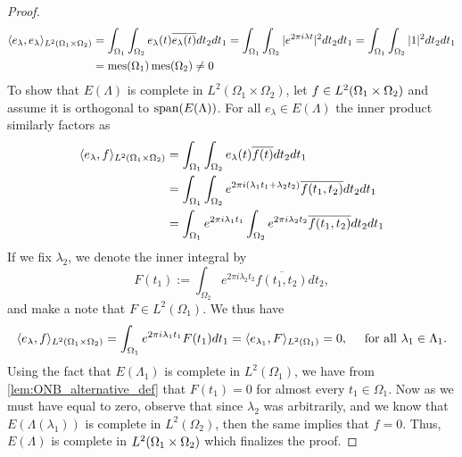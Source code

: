 \documentclass[../thesis.tex]{subfiles}
\begin{document}
\begin{proof}
    \begin{align*}
        \langle e_\lambda, e_\lambda\rangle_{L^2(\Omega_1 \times \Omega_2)}
        &= \int_{\Omega_1} \int_{\Omega_2} e_{\lambda}(t) \overline{e_{\lambda}(t)} dt_2 dt_1
        =\int_{\Omega_1} \int_{\Omega_2} |e^{2 \pi i \lambda t}|^2 dt_2 dt_1
        = \int_{\Omega_1} \int_{\Omega_2} |1|^2 dt_2 dt_1\\
        &= \operatorname{mes}(\Omega_1)\operatorname{mes}(\Omega_2) \neq 0
    \end{align*}
    To show that $E(\Lambda)$ is complete in $L^2(\Omega_1 \times \Omega_2)$, let $f\in L^2(\Omega_1 \times \Omega_2)$ and assume it is orthogonal to $\operatorname{span}(E(\Lambda))$. For all $e_\lambda \in E(\Lambda)$ the inner product similarly factors as
    \begin{align*} %
        \braa{e_\lambda,f}_{L^2\brac{\Omega_1 \times \Omega_2}}
        &= \int_{\Omega_1} \int_{\Omega_2} e_\lambda(t) \overline{f(t)} dt_2dt_1 \\
        &= \int_{\Omega_1} \int_{\Omega_2} e^{2\pi i  (\lambda_1 t_1 + \lambda_2 t_2)} \overline{f(t_1,t_2)} dt_2 dt_1 \\
        &= \int_{\Omega_1} e^{2 \pi i \lambda_1 t_1} \int_{\Omega_2}e^{2 \pi i \lambda_2 t_2} \overline{f(t_1,t_2)} dt_2 dt_1
    \end{align*}
    If we fix $\lambda_2$, we denote the inner integral by 
    \begin{equation}\label{eq:inner_eq}
        F(t_1) := \int_{\Omega_2} e^{2 \pi i \lambda_2 t_2} \overline{f(t_1,t_2)} dt_2,
    \end{equation}
    and make a note that $F\in L^2(\Omega_1)$. We thus have %
    \begin{equation}\label{eq:outter_eq}
        \langle e_{\lambda}, f\rangle_{L^2(\Omega_1\times \Omega_2)} = \int_{\Omega_1} e^{2 \pi i \lambda_1 t_1} F(t_1) dt_1 = \langle e_{\lambda_1}, F\rangle_{L^2(\Omega_1)} = 0, \quad \text{ for all } \lambda_1 \in \Lambda_1 .
    \end{equation}
    Using the fact that $E(\Lambda_1)$ is complete in $L^2(\Omega_1)$, we have from \cref{lem:ONB_alternative_def} that $F(t_1)=0$ for almost every $t_1 \in \Omega_1$. Now as we must have  equal to zero, observe that since $\lambda_2$ was arbitrarily, and we know that $E(\Lambda(\lambda_1))$ is complete in $L^2(\Omega_2)$, then the same  implies that $f=0$. Thus, $E(\Lambda)$ is complete in $L^2(\Omega_1 \times \Omega_2)$ which finalizes the proof.

\end{proof}
\end{document}
